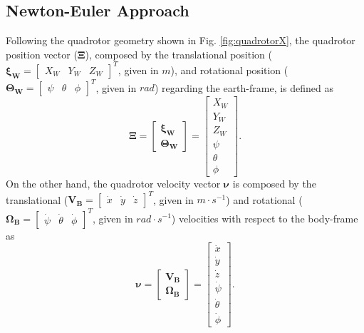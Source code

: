 \subsection{Newton-Euler Approach}
Following the quadrotor geometry shown in Fig. \ref{fig:quadrotorX}, the quadrotor position vector ($\mathbf{\Xi}$), composed by the translational position ($\mathbf{\xi_W} = \begin{bmatrix}
X_W & Y_W & Z_W
\end{bmatrix}^{T} $, given in $m$), and rotational position ($\mathbf{\Theta_W} = \begin{bmatrix}
\psi & \theta & \phi
\end{bmatrix}^{T} $, given in $rad$) regarding the earth-frame, is defined as
\begin{equation}
\mathbf{\Xi} = \begin{bmatrix}
\mathbf{\xi_W} \\ \mathbf{\Theta_W}
\end{bmatrix} = \begin{bmatrix}
X_W \\ Y_W \\ Z_W \\ \psi \\ \theta \\ \phi
\end{bmatrix}.
\end{equation}
On the other hand, the quadrotor velocity vector $\mathbf{\nu}$ is composed by the translational ($\mathbf{V_B} = \begin{bmatrix}
\dot{x}& \dot{y} & \dot{z}
\end{bmatrix}^{T}$, given in $m\cdot s^{-1}$) and rotational ($\mathbf{\Omega_B} = \begin{bmatrix}
\dot{\psi} & \dot{\theta} & \dot{\phi}
\end{bmatrix}^{T}$, given in $rad\cdot s^{-1}$) velocities with respect to the body-frame as
\begin{equation}
\mathbf{\nu} = \begin{bmatrix}
\mathbf{V_B} \\ \mathbf{\Omega_B}
\end{bmatrix} =
\begin{bmatrix}
\dot{x} \\ \dot{y} \\ \dot{z} \\ \dot{\psi} \\ \dot{\theta} \\ \dot{\phi}
\end{bmatrix}.
\end{equation}
